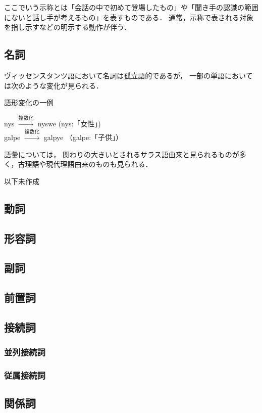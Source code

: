 \documentclass[a4paper,xelatex,ja=standard]{bxjsarticle}
\begin{document}
ここでいう示称とは「会話の中で初めて登場したもの」や「聞き手の認識の範囲にないと話し手が考えるもの」を表すものである．
通常，示称で表される対象を指し示すなどの明示する動作が伴う．

\subsection{名詞}
ヴィッセンスタンツ語において名詞は孤立語的であるが，
一部の単語においては次のような変化が見られる．
\begin{itembox}[l]{語形変化の一例}
 \begin{center}
  nys $\xrightarrow{\text{複数化}}$ nyswe (nys:「女性」) \\
  galpe $\xrightarrow{\text{複数化}}$ galpye （galpe:「子供」）
 \end{center}
\end{itembox}

語彙については，
関わりの大きいとされるサラス語由来と見られるものが多く，古理語や現代理語由来のものも見られる．


以下未作成

\subsection{動詞}
\subsection{形容詞}
\subsection{副詞}
\subsection{前置詞}
\subsection{接続詞}
\subsubsection{並列接続詞}
\subsubsection{従属接続詞}
\subsection{関係詞}
\end{document}
